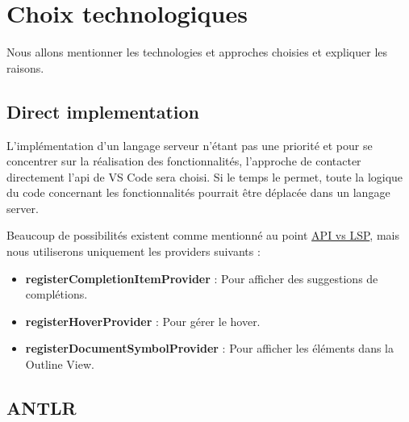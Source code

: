 \documentclass[
    iict, %
    il, %
]{heig-tb}
\begin{document}

\section{Choix technologiques}
Nous allons mentionner les technologies et approches choisies et expliquer les raisons.

\subsection{Direct implementation}
L'implémentation d'un langage serveur n'étant pas une priorité et pour se concentrer sur la réalisation des fonctionnalités, l'approche de contacter directement l'api de VS Code sera choisi.
Si le temps le permet, toute la logique du code concernant les fonctionnalités pourrait être déplacée dans un langage server.

Beaucoup de possibilités existent comme mentionné au point \hyperref[api vs lsp]{API vs LSP}, mais nous utiliserons uniquement les providers suivants :

\begin{itemize}
    \item \textbf{registerCompletionItemProvider} : Pour afficher des suggestions de complétions.
    \item \textbf{registerHoverProvider} : Pour gérer le hover.
    \item \textbf{registerDocumentSymbolProvider} : Pour afficher les éléments dans la Outline View.
\end{itemize}

\subsection{ANTLR}



\end{document}
